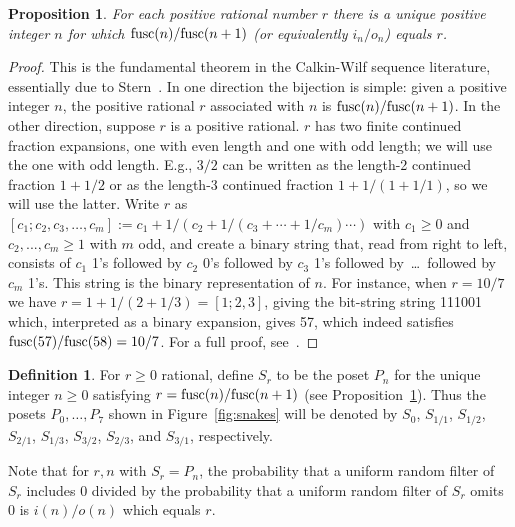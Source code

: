 \documentclass[12pt]{article}
\theoremstyle{plain}
\newtheorem{proposition}[theorem]{Proposition}
\theoremstyle{definition}
\newtheorem{definition}[theorem]{Definition}
\theoremstyle{remark}
\newcommand{\fusc}{{\rm fusc}}
\begin{document}
\begin{proposition}
For each positive rational number $r$
there is a unique positive integer $n$ for which $\fusc(n)/\fusc(n+1)$
(or equivalently $i_n / o_n$) equals $r$. 
\label{prop:cw}
\end{proposition}

\begin{proof}
This is the fundamental theorem in the Calkin-Wilf sequence literature,
essentially due to Stern~\cite{S58}.
In one direction the bijection is simple: given a positive integer $n$,
the positive rational $r$ associated with $n$ is $\fusc(n)/\fusc(n+1)$.
In the other direction, suppose $r$ is a positive rational.
$r$ has two finite continued fraction expansions,
one with even length and one with odd length;
we will use the one with odd length.
E.g., $3/2$ can be written as the length-2 continued fraction $1+1/2$ 
or as the length-3 continued fraction $1+1/(1+1/1)$, so we will use the latter.
Write $r$ as $[c_1;c_2,c_3,\dots,c_m] := 
c_1 + 1/(c_2 + 1/(c_3 + \cdots + 1/c_m) \cdots )$ 
with $c_1 \geq 0$ and $c_2,...,c_m \geq 1$ with $m$ odd,
and create a binary string that, read from right to left,
consists of $c_1$ 1’s followed by $c_2$ 0’s 
followed by $c_3$ 1’s followed by~\dots~followed by $c_m$ 1’s.
This string is the binary representation of $n$.
For instance, when $r=10/7$ we have $r = 1 + 1/(2+1/3) = [1;2,3]$,
giving the bit-string string 111001 which,
interpreted as a binary expansion, gives 57,
which indeed satisfies $\fusc(57)/\fusc(58) = 10/7$.
For a full proof, see~\cite{CW00}. 
\end{proof}

\begin{definition}
For $r \geq 0$ rational,
define $S_r$ to be the poset $P_n$ for the unique integer $n \geq 0$
satisfying $r = \fusc(n)/\fusc(n+1)$
(see Proposition~\ref{prop:cw}).
Thus the posets $P_0,\dots,P_7$ shown in Figure~\ref{fig:snakes} 
will be denoted by $S_0$, $S_{1/1}$, $S_{1/2}$, $S_{2/1}$, $S_{1/3}$,
$S_{3/2}$, $S_{2/3}$, and $S_{3/1}$, respectively.
\end{definition}

Note that for $r,n$ with $S_r = P_n$,
the probability that a uniform random filter of $S_r$ includes 0 divided by
the probability that a uniform random filter of $S_r$ omits 0 is $i(n)/o(n)$
which equals $r$.
\end{document}
